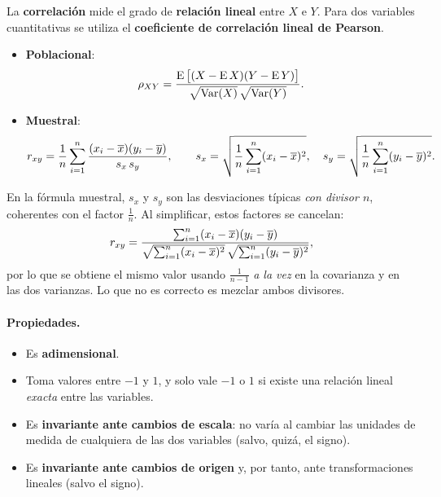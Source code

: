 La \textbf{correlación} mide el grado de \textbf{relación lineal} entre $X$ e $Y$. Para dos
variables cuantitativas se utiliza el \textbf{coeficiente de correlación lineal de Pearson}.

\begin{definicion}
  \begin{itemize}
    \item \textbf{Poblacional}:
      \[
        \rho_{XY} = \frac{\operatorname{E}\big[(X-\operatorname{E} X)(Y-\operatorname{E} Y)\big]}{\sqrt{\operatorname{Var}(X)}\,\sqrt{\operatorname{Var}(Y)}} .
      \]
    \item \textbf{Muestral}:
      \[
        r_{xy} = \frac{1}{n}\sum_{i=1}^{n} \frac{(x_i-\overline{x})(y_i-\overline{y})}{s_x\,s_y},
        \qquad
        s_x=\sqrt{\frac1n\sum_{i=1}^{n}(x_i-\overline{x})^2},\quad
        s_y=\sqrt{\frac1n\sum_{i=1}^{n}(y_i-\overline{y})^2}.
      \]
  \end{itemize}
\end{definicion}

\begin{nota}
  En la fórmula muestral, $s_x$ y $s_y$ son las desviaciones típicas \emph{con divisor $n$},
  coherentes con el factor $\tfrac1n$. Al simplificar, estos factores se cancelan:
  \[
    r_{xy} = \frac{\sum_{i=1}^{n} (x_i-\overline{x})(y_i-\overline{y})}
                  {\sqrt{\sum_{i=1}^{n} (x_i-\overline{x})^2}\,\sqrt{\sum_{i=1}^{n} (y_i-\overline{y})^2}},
  \]
  por lo que se obtiene el mismo valor usando $\tfrac{1}{n-1}$ \emph{a la vez} en la
  covarianza y en las dos varianzas. Lo que no es correcto es mezclar ambos divisores.
\end{nota}

\paragraph{Propiedades.}
\begin{itemize}
  \item Es \textbf{adimensional}.
  \item Toma valores entre $-1$ y $1$, y solo vale $-1$ o $1$ si existe una relación lineal
    \emph{exacta} entre las variables.
  \item Es \textbf{invariante ante cambios de escala}: no varía al cambiar las unidades de
    medida de cualquiera de las dos variables (salvo, quizá, el signo).
  \item Es \textbf{invariante ante cambios de origen} y, por tanto, ante transformaciones
    lineales (salvo el signo).
\end{itemize}

